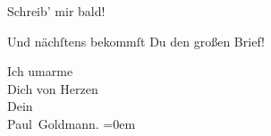 \pstart
           Schreib’ mir bald!\pend
           
\pstart
           Und nächſtens bekommſt Du den großen Brief!\pend
           
\pstart
           Ich umarme {\\[\baselineskip]}Dich von Herzen {\\[\baselineskip]}Dein {\\[\baselineskip]}\spacefill\mbox{Paul Goldmann.}\pend
           \leftskip=0em{}\endnumbering{}  \newcommand{\dateiname}{L02735}\newcommand{\titel}{Paul Goldmann an Arthur Schnitzler, 19. 5. [1895]}\newcommand{\editorInnen}{Martin Anton Müller und Laura Untner}
